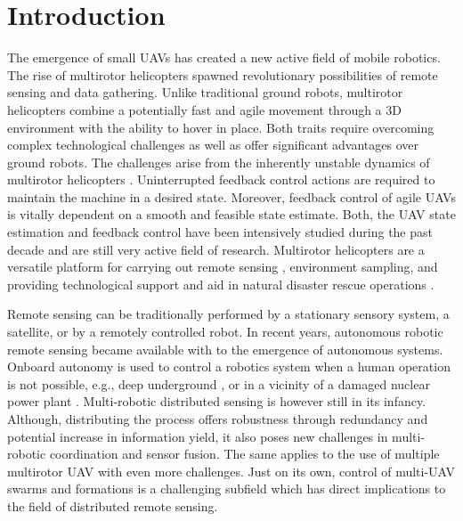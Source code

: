 \documentclass[a4paper,11pt,titlepage,twoside]{book}
\newcommand{\chapternoclear}[1]{
  \begingroup
  \let\cleardoublepage\clearpage
  \chapter{#1}
  \endgroup
}
\newcommand{\conditionalClearPage}{
  \ifdefined\printversion
  \clearemptydoublepage
  \else
  \newpage{}
  \clearpage
  \fi
}
\begin{document}


\conditionalClearPage


\conditionalClearPage


\conditionalClearPage


\pagestyle{fancy}

\conditionalClearPage
\tableofcontents



\chapternoclear{Introduction}

The emergence of small \acp{UAV} has created a new active field of mobile robotics.
The rise of multirotor helicopters spawned revolutionary possibilities of remote sensing and data gathering.
Unlike traditional ground robots, multirotor helicopters combine a potentially fast and agile movement through a 3D environment with the ability to hover in place.
Both traits require overcoming complex technological challenges as well as offer significant advantages over ground robots.
The challenges arise from the inherently unstable dynamics of multirotor helicopters \cite{kumar2012opportunities, mueller2014stability}.
Uninterrupted feedback control actions are required to maintain the machine in a desired state.
Moreover, feedback control of agile \acp{UAV} is vitally dependent on a smooth and feasible state estimate.
Both, the \ac{UAV} state estimation \cite{merino2006vision, burri2015robust, grabe2015nonlinear} and feedback control \cite{lee2010geometric, goodarzi2015geometric, kamel2017robust} have been intensively studied during the past decade and are still very active field of research.
Multirotor helicopters are a versatile platform for carrying out remote sensing \cite{colomina2014unmanned, pajares2015overview}, environment sampling, and providing technological support and aid in natural disaster rescue operations \cite{yuan2015survey, perks2016advances}.

Remote sensing can be traditionally performed by a stationary sensory system, a satellite, or by a remotely controlled robot.
In recent years, autonomous robotic remote sensing became available with to the emergence of autonomous systems.
Onboard autonomy is used to control a robotics system when a human operation is not possible, e.g., deep underground \cite{apachristos2019autonomous, losch2018design}, or in a vicinity of a damaged nuclear power plant \cite{sato2019radiation}.
Multi-robotic distributed sensing is however still in its infancy.
Although, distributing the process offers robustness through redundancy and potential increase in information yield, it also poses new challenges in multi-robotic coordination and sensor fusion.
The same applies to the use of multiple multirotor \ac{UAV} with even more challenges.
Just on its own, control of multi-\ac{UAV} swarms and formations is a challenging subfield which has direct implications to the field of distributed remote sensing.
\end{document}
